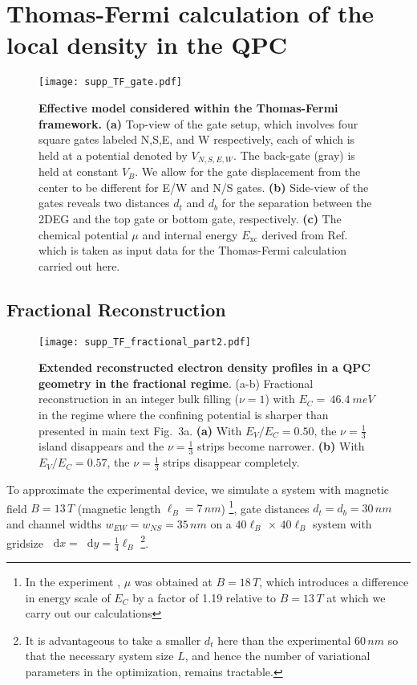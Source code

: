 \documentclass[reprint,prl,aps,superscriptaddress]{revtex4-1}
\newcommand\dif{\mathop{}\!\mathrm{d}}
\begin{document}
\section{Thomas-Fermi calculation of the local density in the QPC}
\label{app:TF_cal}

\begin{figure*}[ht]
    \centering
    \texttt{[image: supp\_TF\_gate.pdf]}
    \caption{
    \textbf{Effective model considered within the Thomas-Fermi framework.}
    \textbf{(a)} Top-view of the gate setup, which involves four square gates labeled N,S,E, and W respectively, each of which is held at a potential denoted by $V_{N,S,E,W}$.
    The back-gate (gray) is held at constant $V_B$.
    We allow for the gate displacement from the center to be different for E/W and N/S gates.
    \textbf{(b)}
    Side-view of the gates reveals two distances $d_t$ and $d_b$ for the separation between the 2DEG and the top gate or bottom gate, respectively.
    \textbf{(c)} 
    The chemical potential $\mu$ and internal energy $E_\textrm{xc}$ derived from Ref.~\cite{yang_experimental_2021} which is taken as input data for the Thomas-Fermi calculation carried out here. 
    }
    \label{fig:tf_model_summary}
\end{figure*}

\subsection{Fractional Reconstruction}

\begin{figure*}[ht!]
    \centering
    \texttt{[image: supp\_TF\_fractional\_part2.pdf]}
    \caption{
    \textbf{Extended reconstructed electron density profiles in a QPC geometry in the fractional regime}. 
    (a-b) Fractional reconstruction in an integer bulk filling ($\nu=1$) with $E_C = \,46.4~\si{meV}$ in the regime where the confining potential is sharper than presented in main text Fig.~3a.
    \textbf{(a)} With $E_V / E_C = 0.50$, the $\nu=\frac13$ island disappears and the $\nu=\frac13$ strips become narrower.
    \textbf{(b)} With $E_V/E_C = 0.57$, the $\nu=\frac13$ strips disappear completely.
    }
    \label{fig:TF_fractional2}
\end{figure*}

To approximate the experimental device, we simulate a system with magnetic field $B = 13 \,\si{T}$ (magnetic length $\ell_B = 7\,\si{nm}$) \footnote{In the experiment \cite{yang_experimental_2021}, $\mu$ was obtained at $B = 18 \, \si{T}$, which introduces a difference in energy scale of $E_C$ by a factor of 1.19 relative to $B = 13 \, \si{T}$ at which we carry out our calculations}, gate distances $d_t = d_b = 30 \, \si{nm}$ and channel widths $w_{EW} = w_{NS} = 35\, \si{nm}$ on a $40 \ell_B \, \times \, 40 \ell_B$ system with gridsize $\dif x = \dif y = \tfrac14 \ell_B$ \footnote{It is advantageous to take a smaller $d_t$ here than the experimental $60 \,\si{nm}$ so that the necessary system size $L$, and hence the number of variational parameters in the optimization, remains tractable.}.
\end{document}
